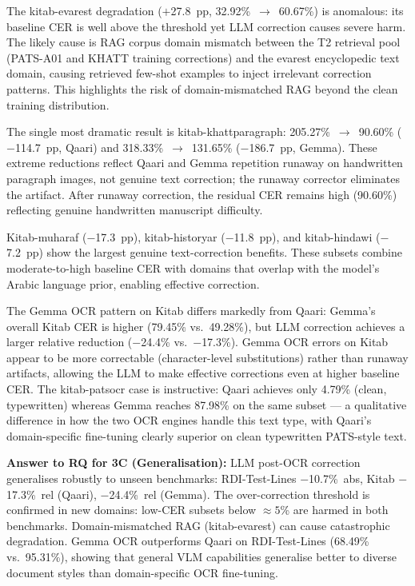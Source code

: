 The kitab-evarest degradation ($+$27.8~pp, 32.92\%~$\to$~60.67\%) is
anomalous: its baseline CER is well above the threshold yet LLM correction
causes severe harm. The likely cause is RAG corpus domain mismatch between
the T2 retrieval pool (PATS-A01 and KHATT training corrections) and the
evarest encyclopedic text domain, causing retrieved few-shot examples to
inject irrelevant correction patterns. This highlights the risk of
domain-mismatched RAG beyond the clean training distribution.

The single most dramatic result is kitab-khattparagraph:
205.27\%~$\to$~90.60\% ($-$114.7~pp, Qaari) and
318.33\%~$\to$~131.65\% ($-$186.7~pp, Gemma). These extreme reductions
reflect Qaari and Gemma repetition runaway on handwritten paragraph images,
not genuine text correction; the runaway corrector eliminates the artifact.
After runaway correction, the residual CER remains high (90.60\%)
reflecting genuine handwritten manuscript difficulty.

Kitab-muharaf ($-$17.3~pp), kitab-historyar ($-$11.8~pp), and
kitab-hindawi ($-$7.2~pp) show the largest genuine text-correction benefits.
These subsets combine moderate-to-high baseline CER with domains that overlap
with the model's Arabic language prior, enabling effective correction.

The Gemma OCR pattern on Kitab differs markedly from Qaari: Gemma's overall
Kitab CER is higher (79.45\% vs.\ 49.28\%), but LLM correction achieves a
larger relative reduction ($-$24.4\% vs.\ $-$17.3\%). Gemma OCR errors on
Kitab appear to be more correctable (character-level substitutions) rather
than runaway artifacts, allowing the LLM to make effective corrections even
at higher baseline CER. The kitab-patsocr case is instructive: Qaari
achieves only 4.79\% (clean, type\-written) whereas Gemma reaches 87.98\%
on the same subset --- a qualitative difference in how the two OCR engines
handle this text type, with Qaari's domain-specific fine-tuning clearly
superior on clean typewritten PATS-style text.

\textbf{Answer to RQ for 3C (Generalisation):} LLM post-OCR correction
generalises robustly to unseen benchmarks: RDI-Test-Lines $-$10.7\%~abs,
Kitab $-$17.3\%~rel (Qaari), $-$24.4\%~rel (Gemma). The over-correction
threshold is confirmed in new domains: low-CER subsets below $\approx 5$\%
are harmed in both benchmarks. Domain-mismatched RAG (kitab-evarest) can
cause catastrophic degradation. Gemma OCR outperforms Qaari on
RDI-Test-Lines (68.49\% vs.\ 95.31\%), showing that general VLM
capabilities generalise better to diverse document styles than
domain-specific OCR fine-tuning.
